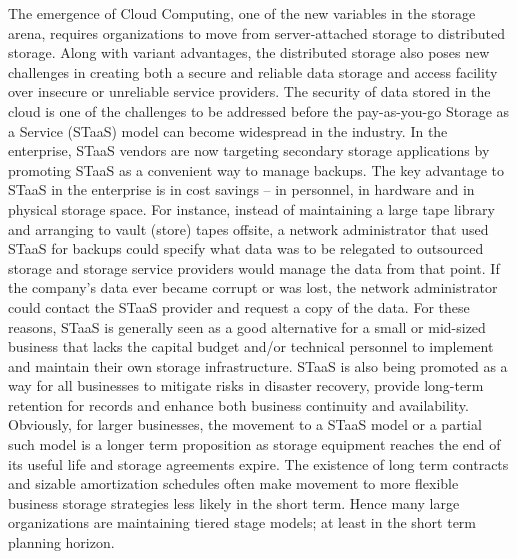 \documentclass[11pt]{article}
\begin{document}
The emergence of Cloud Computing, one of the new variables in the storage arena, 
requires organizations to move from server-attached storage to distributed storage. 
Along with variant advantages, the distributed storage also poses new challenges in 
creating both a secure and reliable data storage and access facility over insecure or 
unreliable service providers. The security of data stored in the cloud is one of the 
challenges to be addressed before the pay-as-you-go Storage as a Service (STaaS) model 
can become widespread in the industry. In the enterprise, STaaS vendors are now targeting 
secondary storage applications by promoting STaaS as a convenient way to manage backups. 
The key advantage to STaaS in the enterprise is in cost savings -- in personnel, in 
hardware and in physical storage space. For instance, instead of maintaining a large tape 
library and arranging to vault (store) tapes offsite, a network administrator that used 
STaaS for backups could specify what data was to be relegated to outsourced storage and 
storage service providers would manage the data from that point. If the company's data 
ever became corrupt or was lost, the network administrator could contact the STaaS 
provider and request a copy of the data. For these reasons, STaaS is generally seen as a 
good alternative for a small or mid-sized business that lacks the capital budget and/or 
technical personnel to implement and maintain their own storage infrastructure. STaaS is 
also being promoted as a way for all businesses to mitigate risks in disaster recovery, 
provide long-term retention for records and enhance both business continuity and 
availability. Obviously, for larger businesses, the movement to a STaaS model or a 
partial such model is a longer term proposition as storage equipment reaches the end 
of its useful life and storage agreements expire. The existence of long term contracts 
and sizable amortization schedules often make movement to more flexible business storage 
strategies less likely in the short term. Hence many large organizations are maintaining 
tiered stage models; at least in the short term planning horizon. 
\end{document}
